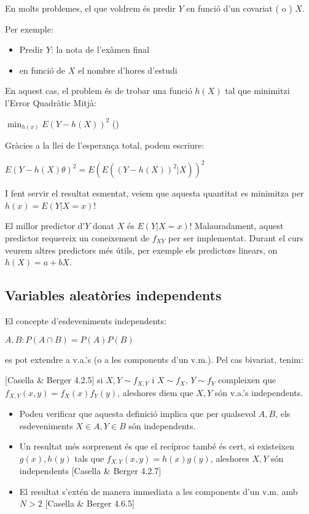 \documentclass[letterpaper,10pt,english]{sphinxmanual}
\begin{document}
En molts problemes, el que voldrem és predir \(Y\) en funció
d’un covariat ( o ) \(X\).

Per exemple:
\begin{itemize}
\item {} 
Predir \(Y\): la nota de l’exàmen final

\item {} 
en funció de \(X\) el nombre d’hores d’estudi

\end{itemize}

En aquest cas, el problem és de trobar una funció \(h(X)\) tal que
minimitzi l’Error Quadràtic Mitjà:

\(\min_{h(x)} E(Y - h(X))^2\) ()

Gràcies a la llei de l’esperança total, podem escriure:

\(E(Y - h(X)\theta)^2 =  E(E(\left(Y - h(X)\right)^2 | X))^2\)

I fent servir el resultat esmentat, veiem que aquesta quantitat es minimitza
per \(h(x) = E(Y | X=x)\)!

El millor predictor d’\(Y\) donat \(X\) és \(E(Y | X=x)\)!
Malauradament, aquest predictor requereix un coneixement de \(f_{XY}\)
per ser implementat. Durant el curs veurem altres predictors més útils,
per exemple els predictors linears, on \(h(X) = a + b X\).


\subsection{Variables aleatòries independents}
\label{\detokenize{0_Intro/0_1_Repas_probabilitat:variables-aleatories-independents}}
El concepte d’esdeveniments independents:

\(A, B: P(A\cap B) = P(A)P(B)\)

es pot extendre a v.a.’s (o a les components d’un v.m.). Pel cas bivariat, tenim:

{[}Casella \& Berger 4.2.5{]} si \(X, Y \sim f_{X,Y}\) i \(X\sim f_{X}\),
\(Y\sim f_{Y}\) compleixen que \(f_{X,Y}(x,y) = f_{X}(x)f_Y(y)\),
aleshores diem que \(X, Y\) són v.a.’s independents.
\begin{itemize}
\item {} 
Podeu verificar que aquesta definició implica que per qualsevol \(A, B\), els esdeveniments \(X\in A, Y \in B\) són independents.

\item {} 
Un resultat més sorprenent és que el recíproc també és cert, si existeixen \(g(x), h(y)\) tals que \(f_{X,Y}(x,y) = h(x)g(y)\), aleshores \(X, Y\) són independents {[}Casella \& Berger 4.2.7{]}

\item {} 
El resultat s’extén de manera immediata a les components d’un v.m. amb \(N>2\) {[}Casella \& Berger 4.6.5{]}

\end{itemize}
\end{document}
